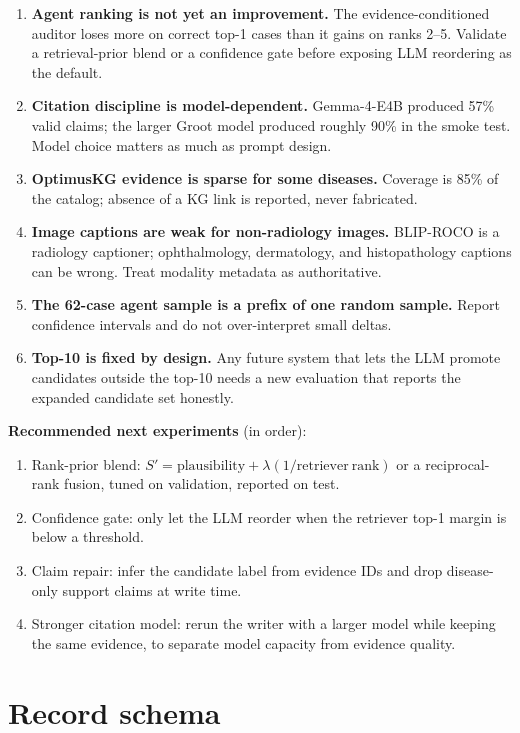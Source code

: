 \documentclass[11pt,a4paper]{article}
\newcommand{\key}[1]{\textbf{#1}}
\begin{document}
\begin{enumerate}[leftmargin=1.4em]
\item \textbf{Agent ranking is not yet an improvement.} The evidence-conditioned
auditor loses more on correct top-1 cases than it gains on ranks 2--5. Validate a
retrieval-prior blend or a confidence gate before exposing LLM reordering as the
default.
\item \textbf{Citation discipline is model-dependent.} Gemma-4-E4B produced 57\%
valid claims; the larger Groot model produced roughly 90\% in the smoke test.
Model choice matters as much as prompt design.
\item \textbf{OptimusKG evidence is sparse for some diseases.} Coverage is 85\% of
the catalog; absence of a KG link is reported, never fabricated.
\item \textbf{Image captions are weak for non-radiology images.} BLIP-ROCO is a
radiology captioner; ophthalmology, dermatology, and histopathology captions can be
wrong. Treat modality metadata as authoritative.
\item \textbf{The 62-case agent sample is a prefix of one random sample.} Report
confidence intervals and do not over-interpret small deltas.
\item \textbf{Top-10 is fixed by design.} Any future system that lets the LLM
promote candidates outside the top-10 needs a new evaluation that reports the
expanded candidate set honestly.
\end{enumerate}

\key{Recommended next experiments} (in order):
\begin{enumerate}[leftmargin=1.4em]
\item Rank-prior blend: $S' = \mathrm{plausibility} + \lambda(1/\mathrm{retriever\ rank})$
or a reciprocal-rank fusion, tuned on validation, reported on test.
\item Confidence gate: only let the LLM reorder when the retriever top-1 margin is
below a threshold.
\item Claim repair: infer the candidate label from evidence IDs and drop
disease-only support claims at write time.
\item Stronger citation model: rerun the writer with a larger model while keeping
the same evidence, to separate model capacity from evidence quality.
\end{enumerate}

\appendix
\section{Record schema}
\end{document}
